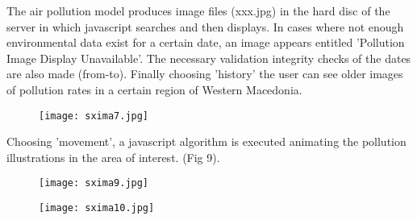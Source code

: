 \documentclass[conference]{IEEEtran}
\begin{document}
The air pollution model produces image files  (xxx.jpg) in the hard disc of the server in which javascript searches and then displays. In cases where not enough environmental data exist for a certain date, an image appears entitled 'Pollution Image Display Unavailable'. The necessary validation integrity checks of the dates are also made (from-to). Finally choosing 'history' the user can see older images of pollution rates in a certain region of Western Macedonia.

\begin{figure}[!h]
	\centering
	\texttt{[image: sxima7.jpg]}
	\caption{}
\end{figure}

Choosing 'movement', a javascript algorithm is executed animating the  pollution illustrations in the area of interest. (Fig 9).
 
\begin{figure}[!h]
	\centering
	\texttt{[image: sxima9.jpg]}
	\caption{}
\end{figure}



 \begin{figure}[!h]
	\centering
	\texttt{[image: sxima10.jpg]}
	\caption{}
\end{figure}
\end{document}
